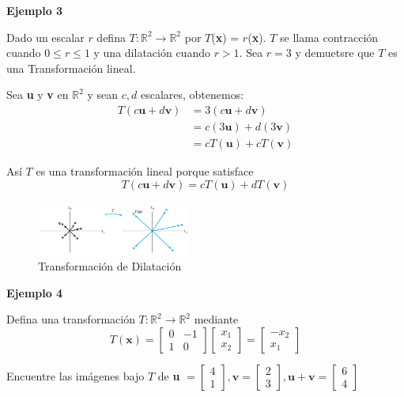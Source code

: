 \documentclass[12 pt]{article}
\begin{document}
\begin{large}
    \textbf{Ejemplo 3}
\end{large}

Dado un escalar $r$ defina $T: \mathbb{R}^2 \rightarrow \mathbb{R}^2$ por $T$(\textbf{x}) = $r$(\textbf{x}). $T$ se llama contracción cuando $0 \leq r \leq 1$ y una dilatación cuando $r > 1$. Sea $r = 3$ y demuetsre que $T$ es una Transformación lineal.

Sea \textbf{u} y \textbf{v} en $\mathbb{R}^2$ y sean $c, d$ escalares, obtenemos: $$ \begin{aligned}
    T(c\mathbf{u} + d\mathbf{v}) &= 3(c\mathbf{u} + d\mathbf{v})\\
    &= c(3\mathbf{u}) + d(3\mathbf{v})\\
    &= cT(\mathbf{u}) + cT(\mathbf{v})    
\end{aligned} $$

Así $T$ es una transformación lineal porque satisface $$T(c \mathbf{u} + d \mathbf{v}) = cT(\mathbf{u}) + dT(\mathbf{v})$$

\begin{figure}[ht]
  \centerline{\includegraphics[width=0.45\textwidth]{image20.png}}
  \caption{Transformación de Dilatación}
\end{figure}

\pagebreak

\begin{large}
    \textbf{Ejemplo 4}
\end{large}

Defina una transformación $T: \mathbb{R}^2 \rightarrow \mathbb{R}^2$ mediante $$T(\mathbf{x}) = \left[\begin{array}{rr}
    0 & -1\\
    1 & 0
\end{array}\right] \begin{bmatrix}
    x_1 \\ x_2 
\end{bmatrix} = \left[\begin{array}{r}
    -x_2 \\ x_1
\end{array}\right] $$

Encuentre las imágenes bajo $T$ de \textbf{u} $= \begin{bmatrix}
    4 \\ 1
\end{bmatrix}, \mathbf{v} = \begin{bmatrix}
    2 \\ 3
\end{bmatrix}, \mathbf{u + v} = \begin{bmatrix}
    6 \\ 4
\end{bmatrix}$
\end{document}
